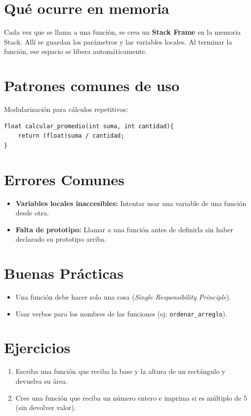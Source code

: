 \documentclass[12pt,a4paper]{article}
\begin{document}
\section{Qué ocurre en memoria}
Cada vez que se llama a una función, se crea un \textbf{Stack Frame} en la memoria Stack. Allí se guardan los parámetros y las variables locales. Al terminar la función, ese espacio se libera automáticamente.

\section{Patrones comunes de uso}
Modularización para cálculos repetitivos:
\begin{lstlisting}
float calcular_promedio(int suma, int cantidad){
    return (float)suma / cantidad;
}
\end{lstlisting}

\section{Errores Comunes}
\begin{itemize}
    \item \textbf{Variables locales inaccesibles:} Intentar usar una variable de una función desde otra.
    \item \textbf{Falta de prototipo:} Llamar a una función antes de definirla sin haber declarado su prototipo arriba.
\end{itemize}

\section{Buenas Prácticas}
\begin{itemize}
    \item Una función debe hacer solo una cosa (\textit{Single Responsibility Principle}).
    \item Usar verbos para los nombres de las funciones (ej: \texttt{ordenar\_arreglo}).
\end{itemize}

\section{Ejercicios}
\begin{enumerate}
    \item Escriba una función que reciba la base y la altura de un rectángulo y devuelva su área.
    \item Cree una función que reciba un número entero e imprima si es múltiplo de 5 (sin devolver valor).
\end{enumerate}
\end{document}
